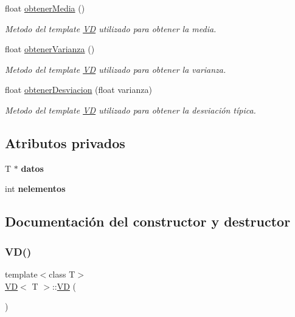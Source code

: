 \begin{DoxyCompactItemize}
float \hyperlink{classVD_aa480a2e4480402b23d9ae83fd1cf661e}{obtener\+Media} ()
\begin{DoxyCompactList}\small\item\em Metodo del template \hyperlink{classVD}{VD} utilizado para obtener la media. \end{DoxyCompactList}\item 
float \hyperlink{classVD_a9aa1d47f997319e54e1429363e830ef7}{obtener\+Varianza} ()
\begin{DoxyCompactList}\small\item\em Metodo del template \hyperlink{classVD}{VD} utilizado para obtener la varianza. \end{DoxyCompactList}\item 
float \hyperlink{classVD_a65a0f383bce59447393168d183c8a945}{obtener\+Desviacion} (float varianza)
\begin{DoxyCompactList}\small\item\em Metodo del template \hyperlink{classVD}{VD} utilizado para obtener la desviación típica. \end{DoxyCompactList}\end{DoxyCompactItemize}
\subsection*{Atributos privados}
\begin{DoxyCompactItemize}
\item 
\mbox{\label{classVD_affc5ceba10ca993ec60d3398857e24d0}} 
T $\ast$ {\bfseries datos}
\item 
\mbox{\label{classVD_a81b9cf437bfdf7c1db4fb273dff32e4a}} 
int {\bfseries nelementos}
\end{DoxyCompactItemize}


\subsection{Documentación del constructor y destructor}
\mbox{\label{classVD_a85d6e04a09adabaefe28fc440f4d9102}} 
\subsubsection{\texorpdfstring{V\+D()}{VD()}\hspace{0.1cm}{\footnotesize\ttfamily [1/3]}}
{\footnotesize\ttfamily template$<$class T$>$ \\
\hyperlink{classVD}{VD}$<$ T $>$\+::\hyperlink{classVD}{VD} (\begin{DoxyParamCaption}{ }\end{DoxyParamCaption})\hspace{0.3cm}{\ttfamily [inline]}}



